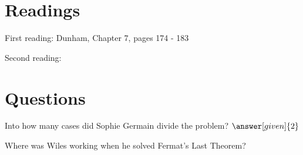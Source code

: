 \documentclass[nooutcomes]{ximera}
\begin{document}
\section{Readings}
First reading: Dunham, Chapter 7, pages 174 - 183

Second reading: 



\section{Questions}

\begin{question}
Into how many cases did Sophie Germain divide the problem? $\answer[given]{2}$
\end{question}

\begin{question}
Where was Wiles working when he solved Fermat's Last Theorem?
\begin{multipleChoice}
\end{multipleChoice}
\end{question}

%
%


\end{document}
